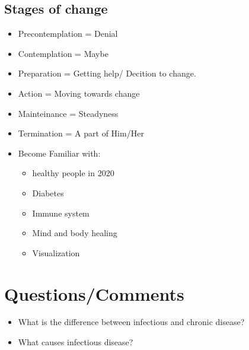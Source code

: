\documentclass[]{article}
\begin{document}
\subsection{Stages of change}

	\begin{itemize}
		\item Precontemplation = Denial 
		\item Contemplation = Maybe 
		\item Preparation = Getting help/ Decition to change. 
		\item Action = Moving towards change 
		\item Mainteinance = Steadyness 
		\item Termination = A part of Him/Her 
	\end{itemize}
	
	\begin{itemize}
		\item Become Familiar with:
		\begin{itemize}
			\item healthy people in 2020
			\item Diabetes
			\item Immune system
			\item Mind and body healing 
			\item Visualization
		\end{itemize}
		
	\end{itemize}
	
\section{Questions/Comments}

\begin{itemize}
		\item What is the difference between infectious and chronic disease?
		\item What causes infectious disease?
\end{itemize}
\end{document}
